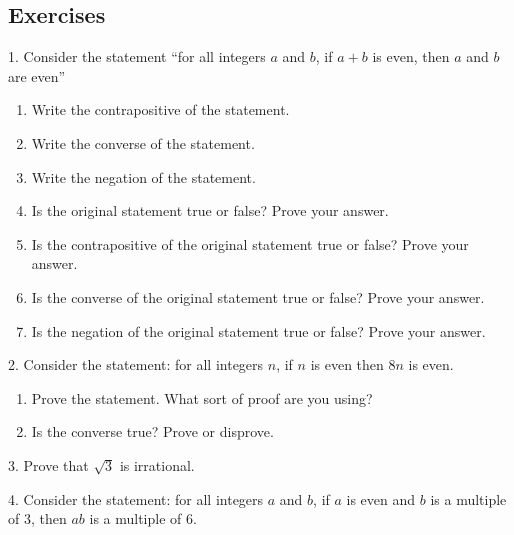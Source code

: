 \documentclass[10pt,]{book}
\theoremstyle{plain}
\theoremstyle{definition}
\theoremstyle{definition}
\theoremstyle{definition}
\numberwithin{equation}{chapter}
\begin{document}
\subsection[Exercises]{Exercises}\label{exercises-22}
\begin{exerciselist}
\item[1.]\hypertarget{exercise-232}{}
Consider the statement ``for all integers \(a\) and \(b\), if \(a + b\) is even, then \(a\) and \(b\) are even''
%
\leavevmode%
\begin{enumerate}[label=(\alph*)]
\item\hypertarget{li-1091}{}
Write the contrapositive of the statement.
%
\item\hypertarget{li-1092}{}
Write the converse of the statement.
%
\item\hypertarget{li-1093}{}
Write the negation of the statement.
%
\item\hypertarget{li-1094}{}
Is the original statement true or false?  Prove your answer.
%
\item\hypertarget{li-1095}{}
Is the contrapositive of the original statement true or false?  Prove your answer.
%
\item\hypertarget{li-1096}{}
Is the converse of the original statement true or false?  Prove your answer.
%
\item\hypertarget{li-1097}{}
Is the negation of the original statement true or false?  Prove your answer.
%
\end{enumerate}
\par\smallskip
\item[2.]\hypertarget{exercise-233}{}
Consider the statement: for all integers \(n\), if \(n\) is even then \(8n\) is even.
%
\leavevmode%
\begin{enumerate}[label=(\alph*)]
\item\hypertarget{li-1105}{}
Prove the statement.  What sort of proof are you using?
%
\item\hypertarget{li-1106}{}
Is the converse true?  Prove or disprove.
%
\end{enumerate}
\par\smallskip
\item[3.]\hypertarget{exercise-234}{}
Prove that \(\sqrt 3\) is irrational.
%
\par\smallskip
\item[4.]\hypertarget{exercise-235}{}
Consider the statement: for all integers \(a\) and \(b\), if \(a\) is even and \(b\) is a multiple of 3, then \(ab\) is a multiple of 6.
%
\leavevmode%
\begin{enumerate}[label=(\alph*)]

\end{enumerate}
\end{exerciselist}
\end{document}
